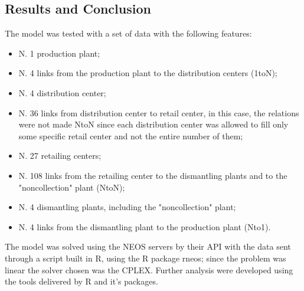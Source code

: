 \begin{doublespace}
\section{Results and Conclusion}
The model was tested with a set of data with the following features:

\begin{itemize}
    \item N. 1 production plant;
    \item N. 4 links from the production plant to the distribution centers (1toN);
    \item N. 4 distribution center;
    \item N. 36 links from distribution center to retail center, in this case, the relations were not made NtoN since each distribution center was allowed to fill only some specific retail center and not the entire number of them;
    \item N. 27 retailing centers;
    \item N. 108 links from the retailing center to the dismantling plants and to the "noncollection" plant (NtoN);
    \item N. 4 dismantling plants, including the "noncollection" plant;
    \item N. 4 links from the dismantling plant to the production plant (Nto1).
\end{itemize}

The model was solved using the NEOS servers\cite{Ferris_2000}\cite{Dolan_2001} by their API with the data sent through a script built in R, using the R\cite{R_2017} package rneos; since the problem was linear the solver chosen was the CPLEX. Further analysis were developed using the tools delivered by R and it's packages.


\end{doublespace}
